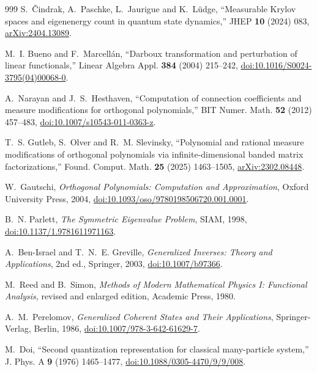 \documentclass[a4paper,11pt]{article}
\theoremstyle{definition}
\theoremstyle{remark}
\begin{document}
\begin{thebibliography}{999}
S.~\v{C}indrak, A.~Paschke, L.~Jaurigue and K.~L\"udge,
``Measurable Krylov spaces and eigenenergy count in quantum state dynamics,''
JHEP \textbf{10} (2024) 083,
\href{https://arxiv.org/abs/2404.13089}{arXiv:2404.13089}.

M.~I. Bueno and F.~Marcell\'an, ``Darboux transformation and perturbation of linear functionals,'' Linear Algebra Appl. \textbf{384} (2004) 215--242,
\href{https://doi.org/10.1016/S0024-3795(04)00068-0}{doi:10.1016/S0024-3795(04)00068-0}.

A.~Narayan and J.~S.~Hesthaven,
``Computation of connection coefficients and measure modifications for orthogonal polynomials,''
BIT Numer. Math. \textbf{52} (2012) 457--483,
\href{https://doi.org/10.1007/s10543-011-0363-z}{doi:10.1007/s10543-011-0363-z}.

T.~S. Gutleb, S.~Olver and R.~M. Slevinsky,
``Polynomial and rational measure modifications of orthogonal polynomials via infinite-dimensional banded matrix factorizations,''
Found. Comput. Math. \textbf{25} (2025) 1463--1505,
\href{https://arxiv.org/abs/2302.08448}{arXiv:2302.08448}.

W.~Gautschi, \emph{Orthogonal Polynomials: Computation and Approximation}, Oxford University Press, 2004,
\href{https://doi.org/10.1093/oso/9780198506720.001.0001}{doi:10.1093/oso/9780198506720.001.0001}.

B.~N. Parlett, \emph{The Symmetric Eigenvalue Problem}, SIAM, 1998,
\href{https://doi.org/10.1137/1.9781611971163}{doi:10.1137/1.9781611971163}.

A.~Ben-Israel and T.~N.~E. Greville,
\emph{Generalized Inverses: Theory and Applications},
2nd ed., Springer, 2003,
\href{https://doi.org/10.1007/b97366}{doi:10.1007/b97366}.

M.~Reed and B.~Simon,
\emph{Methods of Modern Mathematical Physics I: Functional Analysis},
revised and enlarged edition, Academic Press, 1980.

A.~M.~Perelomov, \emph{Generalized Coherent States and Their Applications}, Springer-Verlag, Berlin, 1986,
\href{https://doi.org/10.1007/978-3-642-61629-7}{doi:10.1007/978-3-642-61629-7}.

M.~Doi, ``Second quantization representation for classical many-particle system,'' J. Phys. A \textbf{9} (1976) 1465--1477,
\href{https://doi.org/10.1088/0305-4470/9/9/008}{doi:10.1088/0305-4470/9/9/008}.


\end{thebibliography}
\end{document}

